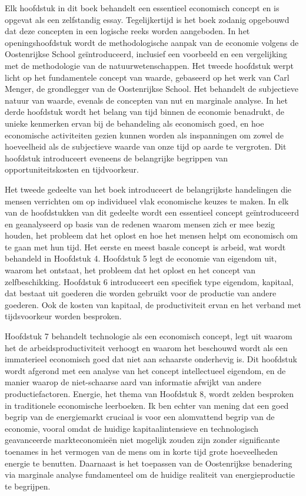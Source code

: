 Elk hoofdstuk in dit boek behandelt een essentieel economisch concept en is opgevat als een zelfstandig essay. Tegelijkertijd is het boek zodanig opgebouwd dat deze concepten in een logische reeks worden aangeboden. In het openingshoofdstuk wordt de methodologische aanpak van de economie volgens de Oostenrijkse School geïntroduceerd, inclusief een voorbeeld en een vergelijking met de methodologie van de natuurwetenschappen. Het tweede hoofdstuk werpt licht op het fundamentele concept van waarde, gebaseerd op het werk van Carl Menger, de grondlegger van de Oostenrijkse School. Het behandelt de subjectieve natuur van waarde, evenals de concepten van nut en marginale analyse. In het derde hoofdstuk wordt het belang van tijd binnen de economie benadrukt, de unieke kenmerken ervan bij de behandeling als economisch goed, en hoe economische activiteiten gezien kunnen worden als inspanningen om zowel de hoeveelheid als de subjectieve waarde van onze tijd op aarde te vergroten. Dit hoofdstuk introduceert eveneens de belangrijke begrippen van opportuniteitskosten en tijdvoorkeur.

Het tweede gedeelte van het boek introduceert de belangrijkste handelingen die mensen verrichten om op individueel vlak economische keuzes te maken. In elk van de hoofdstukken van dit gedeelte wordt een essentieel concept geïntroduceerd en geanalyseerd op basis van de redenen waarom mensen zich er mee bezig houden, het probleem dat het oplost en hoe het mensen helpt om economisch om te gaan met hun tijd. Het eerste en meest basale concept is arbeid, wat wordt behandeld in Hoofdstuk 4. Hoofdstuk 5 legt de economie van eigendom uit, waarom het ontstaat, het probleem dat het oplost en het concept van zelfbeschikking. Hoofdstuk 6 introduceert een specifiek type eigendom, kapitaal, dat bestaat uit goederen die worden gebruikt voor de productie van andere goederen. Ook de kosten van kapitaal, de productiviteit ervan en het verband met tijdsvoorkeur worden besproken.

Hoofdstuk 7 behandelt technologie als een economisch concept, legt uit waarom het de arbeidsproductiviteit verhoogt en waarom het beschouwd wordt als een immaterieel economisch goed dat niet aan schaarste onderhevig is. Dit hoofdstuk wordt afgerond met een analyse van het concept intellectueel eigendom, en de manier waarop de niet-schaarse aard van informatie afwijkt van andere productiefactoren. Energie, het thema van Hoofdstuk 8, wordt zelden besproken in traditionele economische leerboeken. Ik ben echter van mening dat een goed begrip van de energiemarkt cruciaal is voor een alomvattend begrip van de economie, vooral omdat de huidige kapitaalintensieve en technologisch geavanceerde markteconomieën niet mogelijk zouden zijn zonder significante toenames in het vermogen van de mens om in korte tijd grote hoeveelheden energie te benutten. Daarnaast is het toepassen van de Oostenrijkse benadering via marginale analyse fundamenteel om de huidige realiteit van energieproductie te begrijpen.

